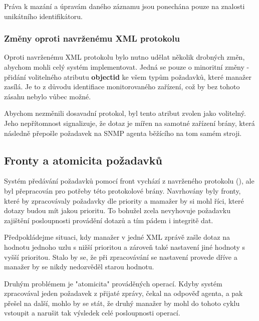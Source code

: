 Práva k mazání a úpravám daného záznamu jsou ponechána pouze na znalosti unikátního identifikátoru. 


\subsubsection*{Změny oproti navrženému XML protokolu}
Oproti navrženému XML protokolu bylo nutno udělat několik drobných změn, abychom mohli celý systém implementovat. Jedná se pouze o
minoritní změny - přidání volitelného atributu \textbf{objectid} ke všem typům požadavků, které manažer zasílá. Je to z důvodu
identifiace monitorovaného zařízení, což by bez tohoto zásahu nebylo vůbec možné.

Abychom nezměnili dosavadní protokol, byl tento atribut zvolen jako volitelný. Jeho nepřítomnost signalizuje, že dotaz je mířen
na samotné zařízení brány, která následně přepošle požadavek na SNMP agenta běžícího na tom samém stroji.


\subsection{Fronty a atomicita požadavků}
\label{kap_impl_fronta_atomicita}
Systém předávání požadavků pomocí front vychází z navrženého protokolu (\cite{macejko_dipl}), ale byl přepracován pro potřeby
této protokolové brány. Navrhovány byly fronty, které by zpracovávaly požadavky dle priority a mamažer by si mohl říci, které
dotazy budou mít jakou prioritu. To bohužel zcela nevyhovuje požadavku zajištění posloupnosti provádění dotazů a tím pádem i 
integritě dat.

Předpokládejme situaci, kdy manažer v jedné XML zprávě zašle dotaz na hodnotu jednoho uzlu s nižší prioritou a zároveň také nastavení
jiné hodnoty s vyšší prioritou. Stalo by se, že při zpracovávání se nastavení provede dříve a manažer by se nikdy nedozvěděl starou hodnotu.

Druhým problémem je "atomicita" prováděných operací. Kdyby systém zpracovával jeden požadavek z přijaté zprávy, čekal na odpověď agenta, a pak
přešel na další, mohlo by se stát, že druhý manažer by mohl do tohoto cyklu vstoupit a narušit tak výsledek celé posloupnosti operací.


